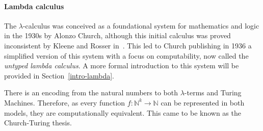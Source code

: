 \documentclass[11pt]{article}
\begin{document}
\paragraph{Lambda calculus}
The $\lambda$-calculus was conceived as a foundational system for mathematics and logic in the 1930s by Alonzo Church, although this initial calculus was proved inconsistent by Kleene and Rosser in~\cite{rosser-kleene-inconsistency}. This led to Church publishing in 1936 a simplified version of this system with a focus on computability, now called the \textit{untyped lambda calculus}. A more formal introduction to this system will be provided in Section~\ref{intro-lambda}.

There is an encoding from the natural numbers to both $\lambda$-terms and Turing Machines. Therefore, as every function $f : \mathbb{N}^k \rightarrow \mathbb{N}$ can be represented in both models, they are computationally equivalent. This came to be known as the Church-Turing thesis.
\end{document}
